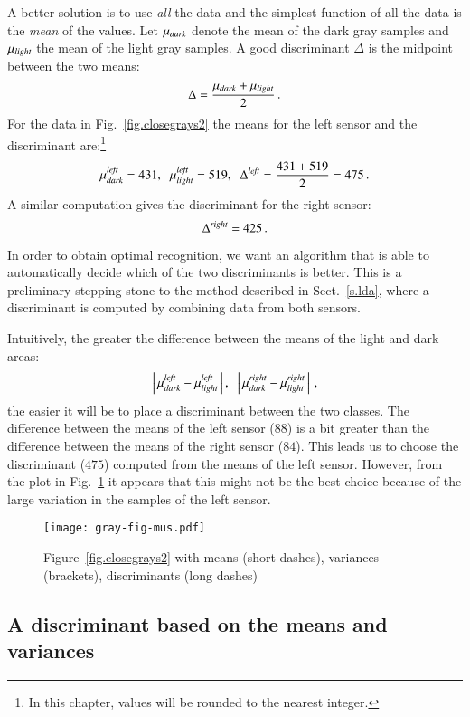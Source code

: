 A better solution is to use \emph{all} the data and the simplest function of all the data is the \emph{mean} of the values. Let $\mu_{\textit{\scriptsize dark}}$ denote the mean of the dark gray samples and $\mu_{\textit{\scriptsize light}}$ the mean of the light gray samples. A good discriminant $\Delta$ is the midpoint between the two means:
\begin{displaymath}
\Delta = \frac{\mu_{\sub{dark}} + \mu_{\sub{light}}}{2}\,.%
\end{displaymath}
For the data in Fig.~\ref{fig.closegrays2} the means for the left sensor and the discriminant are:\footnote{In this chapter, values will be rounded to the nearest integer.}
\[
\mu_{\textit{\scriptsize dark}}^{\textit{\scriptsize left}} = 431,\;\;
\mu_{\textit{\scriptsize light}}^{\textit{\scriptsize left}} = 519,\;\;
\Delta^{\textit{\scriptsize left}} = \frac{431+519}{2} = 475\,.
\]
A similar computation gives the discriminant for the right sensor:
\[
\Delta^{\textit{\scriptsize right}} = 425\,.
\]

In order to obtain optimal recognition, we want an algorithm that is able to automatically decide which of the two discriminants is better. This is a preliminary stepping stone to the method described in Sect.~\ref{s.lda}, where a discriminant is computed by combining data from both sensors.

Intuitively, the greater the difference between the means of the light and dark areas:
\[
\left|\,\mu_{\textit{\scriptsize dark}}^{\textit{\scriptsize left}} - \mu_{\textit{\scriptsize light}}^{\textit{\scriptsize left}}\,\right|,\;\;\left|\,\mu_{\textit{\scriptsize dark}}^{\textit{\scriptsize right}} - \mu_{\textit{\scriptsize light}}^{\textit{\scriptsize right}}\,\right|\,,
\]
the easier it will be to place a discriminant between the two classes. The difference between the means of the left sensor ($88$) is a bit greater than the difference between the means of the right sensor ($84$). This leads us to choose the discriminant ($475$) computed from the means of the left sensor. However, from the plot in Fig.~\ref{fig.closegraysmus} it appears that this might not be the best choice because of the large variation in the samples of the left sensor.

\begin{figure}
\begin{center}
\texttt{[image: gray-fig-mus.pdf]}
\end{center}
\caption{Figure~\ref{fig.closegrays2} with means (short dashes), variances (brackets), discriminants (long dashes)}\label{fig.closegraysmus}
\end{figure}

\subsection{A discriminant based on the means and variances}

